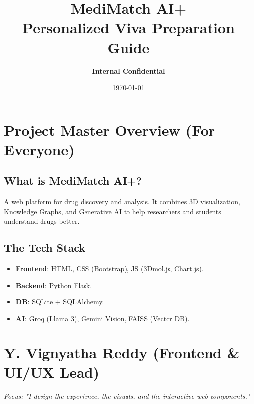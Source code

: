 \documentclass[a4paper,11pt]{report}
\title{\textbf{\Huge MediMatch AI+ \\ \LARGE Personalized Viva Preparation Guide}}
\author{\textbf{Internal Confidential}}
\date{\today}
\begin{document}
\maketitle
\tableofcontents
\newpage

\chapter{Project Master Overview (For Everyone)}
\section{What is MediMatch AI+?}
A web platform for drug discovery and analysis. It combines 3D visualization, Knowledge Graphs, and Generative AI to help researchers and students understand drugs better.

\section{The Tech Stack}
\begin{itemize}
    \item \textbf{Frontend}: HTML, CSS (Bootstrap), JS (3Dmol.js, Chart.js).
    \item \textbf{Backend}: Python Flask.
    \item \textbf{DB}: SQLite + SQLAlchemy.
    \item \textbf{AI}: Groq (Llama 3), Gemini Vision, FAISS (Vector DB).
\end{itemize}

\newpage

\chapter{Y. Vignyatha Reddy (Frontend \& UI/UX Lead)}
\textit{Focus: "I design the experience, the visuals, and the interactive web components."}
\end{document}
